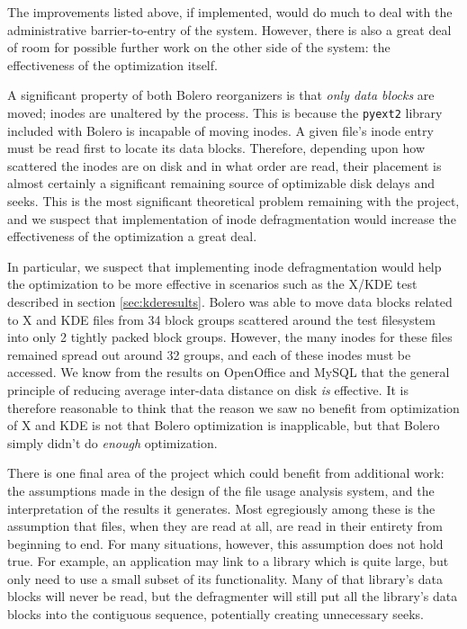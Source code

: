 \documentclass[10pt,twocolumn,letterpaper]{article}
\begin{document}
The improvements listed above, if implemented, would do much to deal with the administrative barrier-to-entry of the system. However, there is also a great deal of room for possible further work on the other side of the system: the effectiveness of the optimization itself.

A significant property of both Bolero reorganizers is that \emph{only data blocks} are moved; inodes are
unaltered by the process. This is because the \texttt{pyext2} library included with Bolero is incapable of moving inodes.  A given file's inode entry must be read first to locate its data blocks. Therefore, depending upon how scattered the inodes are on disk and in what order are read, their placement is almost certainly a significant remaining source of optimizable disk delays and seeks. This is the most significant theoretical problem remaining with the project, and we suspect that implementation of inode defragmentation would increase the effectiveness of the optimization a great deal.

In particular, we suspect that implementing inode defragmentation would help the optimization to be more effective in scenarios such as the X/KDE test described in section \ref{sec:kderesults}. Bolero was able to move data blocks related to X and KDE files from 34 block groups scattered around the test filesystem into only 2 tightly packed block groups. However, the many inodes for these files remained spread out around 32 groups, and each of these inodes must be accessed. We know from the results on OpenOffice and MySQL that the general principle of reducing average inter-data distance on disk \emph{is} effective. It is therefore reasonable to think that the reason we saw no benefit from optimization of X and KDE is not that Bolero optimization is inapplicable, but that Bolero simply didn't do \emph{enough} optimization.

There is one final area of the project which could benefit from additional work: the assumptions made in the design of the file usage analysis system, and the interpretation of the results it generates. Most egregiously among these is the assumption that files, when they are read at all, are read in their entirety from beginning to end. For many situations, however, this assumption does not hold true. For example, an application may link to a library which is quite large, but only need to use a small subset of its functionality. Many of that library's data blocks will never be read, but the defragmenter will still put all the library's data blocks into the contiguous sequence, potentially creating unnecessary seeks.
\end{document}
